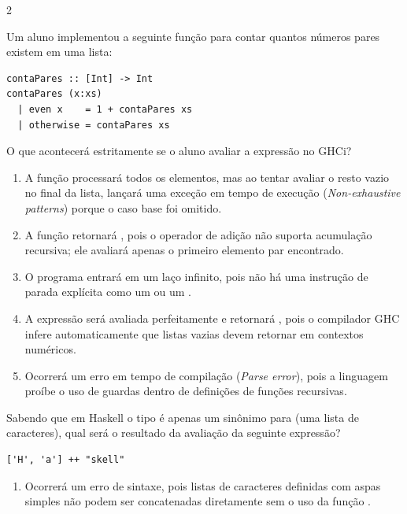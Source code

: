 \documentclass[a4paper,10pt,brazil]{article}
\begin{document}
\begin{multicols}{2}
\begin{enumerate}
\end{enumerate}

Um aluno implementou a seguinte função para contar quantos números pares existem em uma lista:

\begin{verbatim}
contaPares :: [Int] -> Int
contaPares (x:xs)
  | even x    = 1 + contaPares xs
  | otherwise = contaPares xs
\end{verbatim}

O que acontecerá estritamente se o aluno avaliar a expressão  no GHCi?

\begin{enumerate}
  \item A função processará todos os elementos, mas ao tentar avaliar o resto vazio no final da lista, lançará uma exceção em tempo de execução (\emph{Non-exhaustive patterns}) porque o caso base  foi omitido.

  \item A função retornará , pois o operador de adição não suporta acumulação recursiva; ele avaliará apenas o primeiro elemento par encontrado.

  \item O programa entrará em um laço infinito, pois não há uma instrução de parada explícita como um  ou um .

  \item A expressão será avaliada perfeitamente e retornará , pois o compilador GHC infere automaticamente que listas vazias devem retornar  em contextos numéricos.

  \item Ocorrerá um erro em tempo de compilação (\emph{Parse error}), pois a linguagem proíbe o uso de guardas dentro de definições de funções recursivas.


\end{enumerate}

Sabendo que em Haskell o tipo  é apenas um sinônimo para \haskellinline{[Char]} (uma lista de caracteres), qual será o resultado da avaliação da seguinte expressão?
\begin{verbatim}
['H', 'a'] ++ "skell"
\end{verbatim}

\begin{enumerate}
  \item Ocorrerá um erro de sintaxe, pois listas de caracteres definidas com aspas simples não podem ser concatenadas diretamente sem o uso da função .


\end{enumerate}
\end{multicols}
\end{document}
